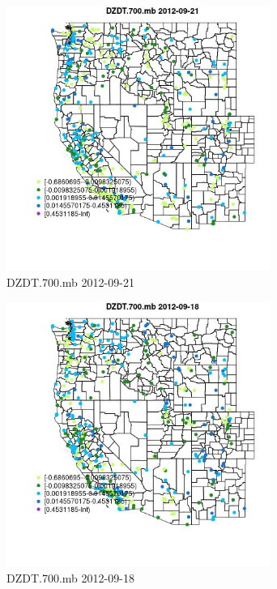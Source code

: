 \begin{figure} 
\centering  
\includegraphics[width=0.77\textwidth]{Code_Outputs/Report_ML_input_PM25_Step4_part_e_de_duplicated_aves_compiled_2019-05-14wNAs_MapObsDZDT700mb2012-09-21.jpg} 
\caption{\label{fig:Report_ML_input_PM25_Step4_part_e_de_duplicated_aves_compiled_2019-05-14wNAsMapObsDZDT700mb2012-09-21}DZDT.700.mb 2012-09-21} 
\end{figure} 
 

\clearpage 

\begin{figure} 
\centering  
\includegraphics[width=0.77\textwidth]{Code_Outputs/Report_ML_input_PM25_Step4_part_e_de_duplicated_aves_compiled_2019-05-14wNAs_MapObsDZDT700mb2012-09-18.jpg} 
\caption{\label{fig:Report_ML_input_PM25_Step4_part_e_de_duplicated_aves_compiled_2019-05-14wNAsMapObsDZDT700mb2012-09-18}DZDT.700.mb 2012-09-18} 
\end{figure} 
 

